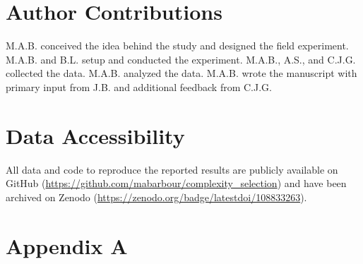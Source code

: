 \documentclass[11pt,]{article}
\begin{document}
\section{Author Contributions}\label{author-contributions}

M.A.B. conceived the idea behind the study and designed the field
experiment. M.A.B. and B.L. setup and conducted the experiment. M.A.B.,
A.S., and C.J.G. collected the data. M.A.B. analyzed the data. M.A.B.
wrote the manuscript with primary input from J.B. and additional
feedback from C.J.G.

\section{Data Accessibility}\label{data-accessibility}

All data and code to reproduce the reported results are publicly
available on GitHub
(\url{https://github.com/mabarbour/complexity_selection}) and have been
archived on Zenodo (\url{https://zenodo.org/badge/latestdoi/108833263}).

\section{Appendix A}\label{appendix-a}

\bigskip
\end{document}
